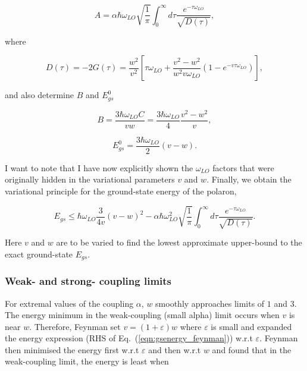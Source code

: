 \begin{equation}
    A = \alpha\hbar\omega_{LO}\sqrt{\frac{1}{\pi}}\int^{\infty}_0 d\tau \frac{e^{-\tau \omega_{LO}}}{\sqrt{ D(\tau)}},
\end{equation}

where

\begin{equation}\label{eqn:FD}
    D(\tau) = -2 G(\tau) = \frac{w^2}{v^2} \left[\tau \omega_{LO} + \frac{v^2-w^2}{w^2 v \omega_{LO}} \left(1-e^{-v\tau\omega_{LO}} \right)\right],
\end{equation}

and also determine $B$ and $E^0_{gs}$

\begin{equation}
    B = \frac{3\hbar\omega_{LO} C}{v w} = \frac{3\hbar\omega_{LO}}{4} \frac{v^2-w^2}{v},
\end{equation}

\begin{equation}
    E^0_{gs} = \frac{3 \hbar \omega_{LO}}{2}(v - w).
\end{equation}

I want to note that I have now explicitly shown the $\omega_{LO}$ factors that were originally hidden in the variational parameters $v$ and $w$. Finally, we obtain the variational principle for the ground-state energy of the polaron,

\begin{equation}
    \label{eqn:gsenergy_feynman}
    E_{gs} \leq \hbar \omega_{LO}\frac{3}{4 v} \left(v-w\right)^2 - \alpha\hbar\omega^2_{LO}\sqrt{\frac{1}{\pi}}\int^{\infty}_0 d\tau \frac{e^{-\tau \omega_{LO}}}{\sqrt{ D(\tau)}}.
\end{equation}

Here $v$ and $w$ are to be varied to find the lowest approximate upper-bound to the exact ground-state $E_{gs}$. 

\subsubsection{Weak- and strong- coupling limits}
\label{subsubsec:2-2-2-1}

For extremal values of the coupling $\alpha$, $w$ smoothly approaches limits of $1$ and $3$. The energy minimum in the weak-coupling (small alpha) limit occurs when $v$ is near $w$. Therefore, Feynman set $v = (1 + \varepsilon) w$ where $\varepsilon$ is small and expanded the energy expression (RHS of Eq.~(\ref{eqn:gsenergy_feynman})) w.r.t $\varepsilon$. Feynman then minimised the energy first w.r.t $\varepsilon$ and then w.r.t $w$ and found that in the weak-coupling limit, the energy is least when

